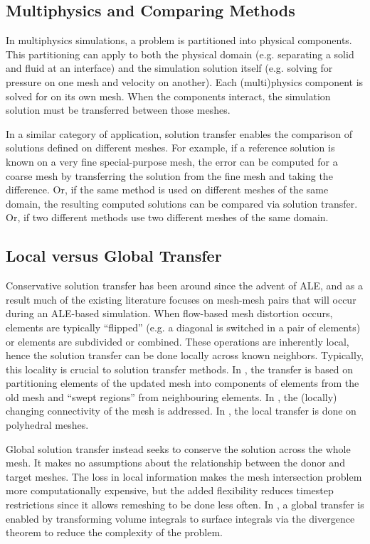 \documentclass[letterpaper,10pt]{article}
\theoremstyle{definition}
\begin{document}
\subsection{Multiphysics and Comparing Methods}

In multiphysics simulations, a problem is partitioned into physical components.
This partitioning can apply to both the physical domain (e.g. separating a
solid and fluid at an interface) and the simulation solution itself (e.g.
solving for pressure on one mesh and velocity on another). Each (multi)physics
component is solved for on its own mesh. When the components interact, the
simulation solution must be transferred between those meshes.

In a similar category of application, solution transfer enables the comparison
of solutions defined on different meshes. For example, if a reference
solution is known on a very fine special-purpose mesh, the error can be
computed for a coarse mesh by transferring the solution from the fine
mesh and taking the difference. Or, if the same method is used on
different meshes of the same domain, the resulting computed solutions can
be compared via solution transfer. Or, if two different methods use two
different meshes of the same domain.

\subsection{Local versus Global Transfer}

Conservative solution transfer has been around since the advent of ALE,
and as a result much of the existing literature focuses on mesh-mesh
pairs that will occur during an ALE-based simulation. When flow-based
mesh distortion occurs, elements are typically ``flipped'' (e.g. a
diagonal is switched in a pair of elements) or elements are subdivided
or combined. These operations are inherently local, hence the solution
transfer can be done locally across known neighbors. Typically, this
locality is crucial to solution transfer methods. In \cite{Margolin2003},
the transfer is based on partitioning elements of the updated mesh into
components of elements from the old mesh and ``swept regions'' from
neighbouring elements. In \cite{Kucharik2008}, the (locally) changing
connectivity of the mesh is addressed. In \cite{Garimella2007}, the
local transfer is done on polyhedral meshes.

Global solution transfer instead seeks to conserve the solution across
the whole mesh. It makes no assumptions about the relationship between
the donor and target meshes. The loss in local information makes
the mesh intersection problem more computationally expensive, but the
added flexibility reduces timestep restrictions since it allows remeshing
to be done less often. In \cite{Dukowicz1984, Dukowicz1987}, a global
transfer is enabled by transforming volume integrals to surface integrals
via the divergence theorem to reduce the complexity of the problem.
\end{document}

